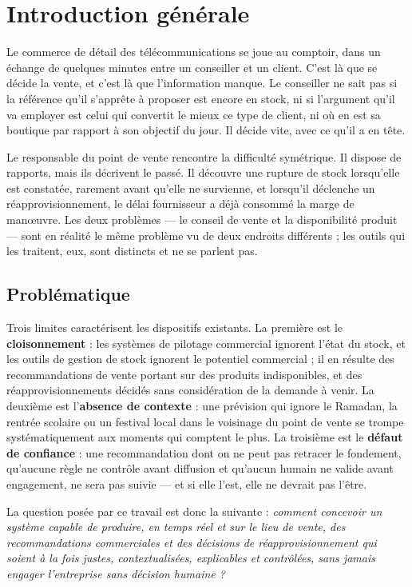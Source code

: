 \chapter*{Introduction générale}

Le commerce de détail des télécommunications se joue au comptoir, dans un échange de quelques minutes entre un conseiller et un client. C'est là que se décide la vente, et c'est là que l'information manque. Le conseiller ne sait pas si la référence qu'il s'apprête à proposer est encore en stock, ni si l'argument qu'il va employer est celui qui convertit le mieux ce type de client, ni où en est sa boutique par rapport à son objectif du jour. Il décide vite, avec ce qu'il a en tête.

Le responsable du point de vente rencontre la difficulté symétrique. Il dispose de rapports, mais ils décrivent le passé. Il découvre une rupture de stock lorsqu'elle est constatée, rarement avant qu'elle ne survienne, et lorsqu'il déclenche un réapprovisionnement, le délai fournisseur a déjà consommé la marge de manœuvre. Les deux problèmes — le conseil de vente et la disponibilité produit — sont en réalité le même problème vu de deux endroits différents ; les outils qui les traitent, eux, sont distincts et ne se parlent pas.

\section*{Problématique}

Trois limites caractérisent les dispositifs existants. La première est le \textbf{cloisonnement} : les systèmes de pilotage commercial ignorent l'état du stock, et les outils de gestion de stock ignorent le potentiel commercial ; il en résulte des recommandations de vente portant sur des produits indisponibles, et des réapprovisionnements décidés sans considération de la demande à venir. La deuxième est l'\textbf{absence de contexte} : une prévision qui ignore le Ramadan, la rentrée scolaire ou un festival local dans le voisinage du point de vente se trompe systématiquement aux moments qui comptent le plus. La troisième est le \textbf{défaut de confiance} : une recommandation dont on ne peut pas retracer le fondement, qu'aucune règle ne contrôle avant diffusion et qu'aucun humain ne valide avant engagement, ne sera pas suivie — et si elle l'est, elle ne devrait pas l'être.

La question posée par ce travail est donc la suivante : \textit{comment concevoir un système capable de produire, en temps réel et sur le lieu de vente, des recommandations commerciales et des décisions de réapprovisionnement qui soient à la fois justes, contextualisées, explicables et contrôlées, sans jamais engager l'entreprise sans décision humaine ?}

